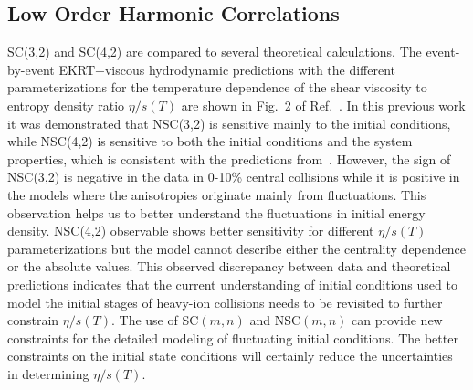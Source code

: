 
\subsection{Low Order Harmonic Correlations}
\label{sec:theory_loworder}
SC(3,2) and SC(4,2) are compared to several theoretical calculations. 
The event-by-event EKRT+viscous hydrodynamic predictions with the different parameterizations for the temperature dependence of the shear viscosity to entropy density ratio $\eta/s(T)$ are shown in Fig.~2 of Ref.~\cite{ALICE:2016kpq}. 
In this previous work it was demonstrated that NSC(3,2) is sensitive mainly to the initial conditions, while NSC(4,2) is sensitive to both the initial conditions and the system properties, which is consistent with the predictions from~\cite{Niemi:2012aj}.
However, the sign of NSC(3,2) is negative in the data in 0-10\% central collisions while it is positive in the models where the anisotropies originate mainly from fluctuations.
This observation helps us to better understand the fluctuations in initial energy density.
NSC(4,2) observable shows better sensitivity for different $\eta/s(T)$ parameterizations but the model cannot describe either the centrality dependence or the absolute values. This observed discrepancy between data and theoretical predictions indicates that the current understanding of initial conditions used to model the initial stages of heavy-ion collisions needs to be revisited to further constrain $\eta/s(T)$.
The use of SC$(m,n)$ and NSC$(m,n)$ can provide new constraints for the detailed modeling of fluctuating initial conditions. The better constraints on the initial state conditions will certainly reduce the uncertainties in determining $\eta/s(T)$.
 
